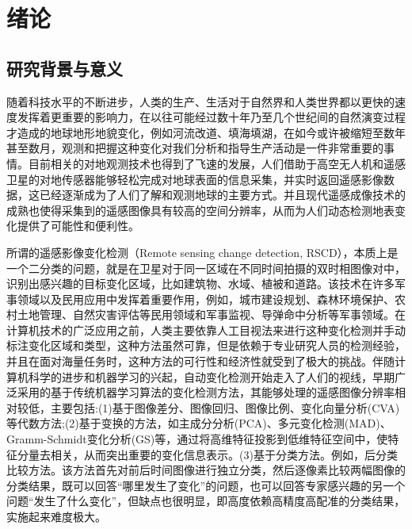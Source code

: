 \documentclass[lang=chs, degree=master, blindreview=false, adobe=false]{yanputhesis}
\begin{document}
\chapter{绪论}
\section{研究背景与意义}
随着科技水平的不断进步，人类的生产、生活对于自然界和人类世界都以更快的速度发挥着更重要的影响力，在以往可能经过数十年乃至几个世纪间的自然演变过程才造成的地球地形地貌变化，例如河流改道、填海填湖，在如今或许被缩短至数年甚至数月，观测和把握这种变化对我们分析和指导生产活动是一件非常重要的事情。目前相关的对地观测技术也得到了飞速的发展，人们借助于高空无人机和遥感卫星的对地传感器能够轻松完成对地球表面的信息采集，并实时返回遥感影像数据，这已经逐渐成为了人们了解和观测地球的主要方式。并且现代遥感成像技术的成熟也使得采集到的遥感图像具有较高的空间分辨率，从而为人们动态检测地表变化提供了可能性和便利性。

所谓的遥感影像变化检测（Remote sensing change detection, RSCD），本质上是一个二分类的问题，就是在卫星对于同一区域在不同时间拍摄的双时相图像对中，识别出感兴趣的目标变化区域，比如建筑物、水域、植被和道路。该技术在许多军事领域以及民用应用中发挥着重要作用，例如，城市建设规划、森林环境保护、农村土地管理、自然灾害评估等民用领域和军事监视、导弹命中分析等军事领域。在计算机技术的广泛应用之前，人类主要依靠人工目视法来进行这种变化检测并手动标注变化区域和类型，这种方法虽然可靠，但是依赖于专业研究人员的检测经验，并且在面对海量任务时，这种方法的可行性和经济性就受到了极大的挑战。伴随计算机科学的进步和机器学习的兴起，自动变化检测开始走入了人们的视线，早期广泛采用的基于传统机器学习算法的变化检测方法，其能够处理的遥感图像分辨率相对较低，主要包括:(1)基于图像差分、图像回归、图像比例、变化向量分析(CVA)等代数方法;(2)基于变换的方法，如主成分分析(PCA)、多元变化检测(MAD)、Gramm-Schmidt变化分析(GS)等，通过将高维特征投影到低维特征空间中，使特征分量去相关，从而突出重要的变化信息表示。(3)基于分类方法。例如，后分类比较方法。该方法首先对前后时间图像进行独立分类，然后逐像素比较两幅图像的分类结果，既可以回答“哪里发生了变化”的问题，也可以回答专家感兴趣的另一个问题“发生了什么变化”，但缺点也很明显，即高度依赖高精度高配准的分类结果，实施起来难度极大。
\end{document}
